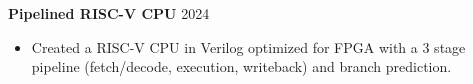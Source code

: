 \textbf{Pipelined RISC-V CPU} \hfill 2024 \par
\begin{itemize}
\item Created a RISC-V CPU in Verilog optimized for FPGA with a 3 stage pipeline (fetch/decode, execution, writeback) and branch prediction.
\end{itemize} \par
